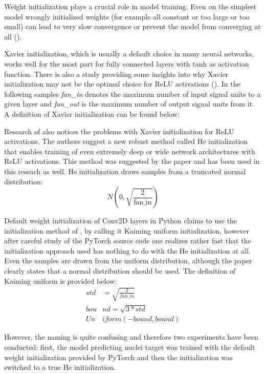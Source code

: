 Weight initialization plays a crucial role in model training. Even on the simplest model wrongly initialized weights (for example all constant or too large or too small) can lead to very slow convergence or prevent the model from converging at all (\cite{Kumar_2017}).

Xavier initialization, which is usually a default choice in many neural networks, works well for the most part for fully connected layers with tanh as activation function. There is also a study providing some insights into why Xavier initialization may not be the optimal choice for ReLU activations (\cite{Kumar_2017}). In the following samples \textit{fan\_in} denotes the maximum number of input signal units to a given layer and \textit{fan\_out} is the maximum number of output signal units from it. A definition of Xavier initialization can be found below:

Research of \cite{He_2015} also notices the problems with Xavier initialization for ReLU activations. The authors suggest a new robust method called He initialization that enables training of even extremely deep or wide network architectures with ReLU activations. This method was suggested by the \cite{Lachance_2020} paper and has been used in this reseach as well. He initialization draws samples from a truncated normal distribution:
\begin{equation}
	N(0, \sqrt{\frac{2}{\text{fan\_in}}})
\end{equation}

Default weight initialization of Conv2D layers in Python claims to use the initialization method of \cite{He_2015}, by calling it Kaiming uniform initialization, however after careful study of the PyTorch source code one realizes rather fast that the initialization approach used has nothing to do with the He initialization at all. Even the samples are drawn from the uniform distribution, although the paper clearly states that a normal distribution should be used. The definition of Kaiming uniform is provided below:
		\begin{align}
			std &= \sqrt{\frac{2}{fan\_in}} \\
			bou&nd = \sqrt{3 * std} \\
			Un&iform(-bound, bound)
		\end{align}

However, the naming is quite confusing and therefore two experiments have been conducted: first, the model predicting nuclei target was trained with the default weight initialization provided by PyTorch and then the initialization was switched to a true He initialization.

